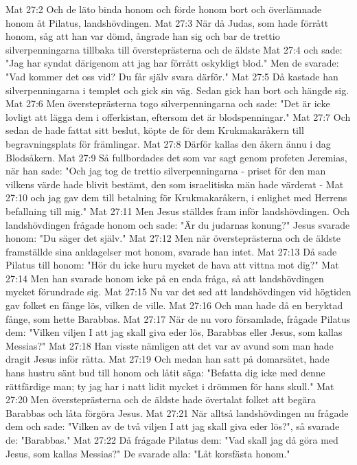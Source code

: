 Mat 27:2  Och de läto binda honom och förde honom bort och överlämnade honom åt Pilatus, landshövdingen.
Mat 27:3  När då Judas, som hade förrått honom, såg att han var dömd, ångrade han sig och bar de trettio silverpenningarna tillbaka till översteprästerna och de äldste
Mat 27:4  och sade: "Jag har syndat därigenom att jag har förrått oskyldigt blod." Men de svarade: "Vad kommer det oss vid? Du får själv svara därför."
Mat 27:5  Då kastade han silverpenningarna i templet och gick sin väg. Sedan gick han bort och hängde sig.
Mat 27:6  Men översteprästerna togo silverpenningarna och sade: "Det är icke lovligt att lägga dem i offerkistan, eftersom det är blodspenningar."
Mat 27:7  Och sedan de hade fattat sitt beslut, köpte de för dem Krukmakaråkern till begravningsplats för främlingar.
Mat 27:8  Därför kallas den åkern ännu i dag Blodsåkern.
Mat 27:9  Så fullbordades det som var sagt genom profeten Jeremias, när han sade: "Och jag tog de trettio silverpenningarna - priset för den man vilkens värde hade blivit bestämt, den som israelitiska män hade värderat -
Mat 27:10  och jag gav dem till betalning för Krukmakaråkern, i enlighet med Herrens befallning till mig."
Mat 27:11  Men Jesus ställdes fram inför landshövdingen. Och landshövdingen frågade honom och sade: "Är du judarnas konung?" Jesus svarade honom: "Du säger det själv."
Mat 27:12  Men när översteprästerna och de äldste framställde sina anklagelser mot honom, svarade han intet.
Mat 27:13  Då sade Pilatus till honom: "Hör du icke huru mycket de hava att vittna mot dig?"
Mat 27:14  Men han svarade honom icke på en enda fråga, så att landshövdingen mycket förundrade sig.
Mat 27:15  Nu var det sed att landshövdingen vid högtiden gav folket en fånge lös, vilken de ville.
Mat 27:16  Och man hade då en beryktad fånge, som hette Barabbas.
Mat 27:17  När de nu voro församlade, frågade Pilatus dem: "Vilken viljen I att jag skall giva eder lös, Barabbas eller Jesus, som kallas Messias?"
Mat 27:18  Han visste nämligen att det var av avund som man hade dragit Jesus inför rätta.
Mat 27:19  Och medan han satt på domarsätet, hade hans hustru sänt bud till honom och låtit säga: "Befatta dig icke med denne rättfärdige man; ty jag har i natt lidit mycket i drömmen för hans skull."
Mat 27:20  Men översteprästerna och de äldste hade övertalat folket att begära Barabbas och låta förgöra Jesus.
Mat 27:21  När alltså landshövdingen nu frågade dem och sade: "Vilken av de två viljen I att jag skall giva eder lös?", så svarade de: "Barabbas."
Mat 27:22  Då frågade Pilatus dem: "Vad skall jag då göra med Jesus, som kallas Messias?" De svarade alla: "Låt korsfästa honom."
